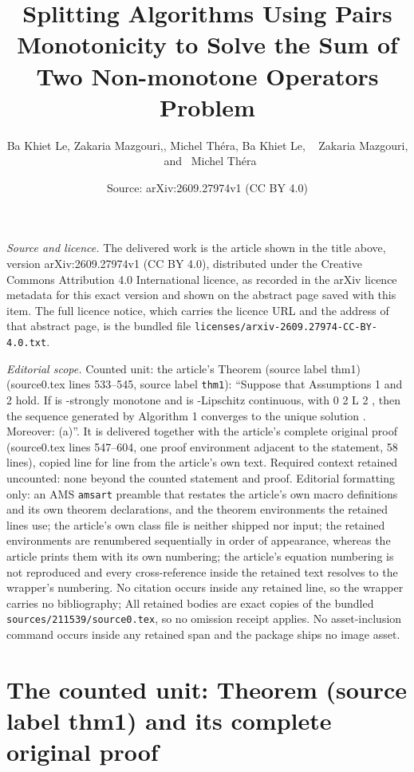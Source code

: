 \documentclass[10pt,a4paper]{amsart}
\title[Splitting Algorithms Using Pairs Monotonicity to Solve the Sum of Two Non-monotone Operators Problem]{Splitting Algorithms Using Pairs Monotonicity to Solve the Sum of Two Non-monotone Operators Problem}
\author{Ba Khiet Le, Zakaria Mazgouri,, Michel Th\'era, Ba Khiet Le, 
~
Zakaria Mazgouri, 
~and~ 
Michel Th\' era}
\date{Source: arXiv:2609.27974v1 (CC BY 4.0)}
\theoremstyle{plain}
\theoremstyle{definition}
\begin{document}
\maketitle

\noindent\emph{Source and licence.} The delivered work is the article shown in the title above, version arXiv:2609.27974v1 (CC BY 4.0), distributed under the Creative Commons Attribution 4.0 International licence, as recorded in the arXiv licence metadata for this exact version and shown on the abstract page saved with this item. The full licence notice, which carries the licence URL and the address of that abstract page, is the bundled file \texttt{licenses/arxiv-2609.27974-CC-BY-4.0.txt}.
\par\smallskip

\noindent\textit{Editorial scope.} Counted unit: the article's Theorem (source label thm1) (source0.tex lines 533--545, source label \texttt{thm1}): ``Suppose that Assumptions 1 and 2 hold. If is -strongly monotone and is -Lipschitz continuous, with 0 2 L 2 , then the sequence generated by Algorithm 1 converges to the unique solution . Moreover: (a)''. It is delivered together with the article's complete original proof (source0.tex lines 547--604, one proof environment adjacent to the statement, 58 lines), copied line for line from the article's own text. Required context retained uncounted: none beyond the counted statement and proof. Editorial formatting only: an AMS \texttt{amsart} preamble that restates the article's own macro definitions and its own theorem declarations, and the theorem environments the retained lines use; the article's own class file is neither shipped nor input; the retained environments are renumbered sequentially in order of appearance, whereas the article prints them with its own numbering; the article's equation numbering is not reproduced and every cross-reference inside the retained text resolves to the wrapper's numbering. No citation occurs inside any retained line, so the wrapper carries no bibliography; All retained bodies are exact copies of the bundled \texttt{sources/211539/source0.tex}, so no omission receipt applies. No asset-inclusion command occurs inside any retained span and the package ships no image asset.


\section{The counted unit: Theorem (source label thm1) and its complete original proof}
\end{document}
